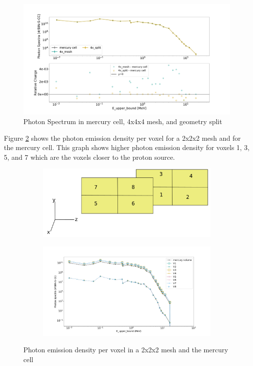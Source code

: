 \begin{figure}[H]
 \centering
 \includegraphics[scale=0.42,trim={2cm 0.5cm 3cm 2cm},clip]{../figs/toy_p1/spec_VPI_4x.pdf}
 \caption{Photon Spectrum in mercury cell, 4x4x4 mesh, and geometry split}
 \label{fig:1spec_cell_4x}
\end{figure}
%
Figure \ref{fig:1spec_8v} shows the photon emission density per voxel for a
2x2x2 mesh and for the mercury cell. This graph shows higher photon emission
density for voxels 1, 3, 5, and 7 which are the voxels closer to the proton
source.
\begin{figure}[H]
	\begin{subfigure}[t]{1.0\textwidth}
		\hfill
		\includegraphics[scale=0.4, trim={0cm 0cm 0cm 0cm},clip]{../figs/voxels.png}
	\end{subfigure}\hfill
	\begin{subfigure}[t]{1.0\textwidth}
		\centering
		\includegraphics[scale=0.4, trim={2.5cm 1cm 3cm 3cm},clip]{../figs/toy_p1/spec_VPI_8.pdf}
	\end{subfigure}
	\caption{Photon emission density per voxel in a 2x2x2 mesh and the mercury cell}
	\label{fig:1spec_8v}
\end{figure}
